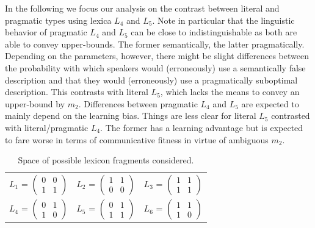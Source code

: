 \documentclass[10pt,a4paper]{article}
\begin{document}
In the following we focus our analysis on the contrast between literal and pragmatic types using lexica $L_4$ and $L_5$. Note in particular that the linguistic behavior of pragmatic $L_4$ and $L_5$ can be close to indistinguishable as both are able to convey upper-bounds. The former semantically, the latter pragmatically. Depending on the parameters, however, there might be slight differences between the probability with which speakers would (erroneously) use a semantically false description and that they would (erroneously) use a pragmatically suboptimal description. This contrasts with literal $L_5$, which lacks the means to convey an upper-bound by $m_2$. Differences between pragmatic $L_4$ and $L_5$ are expected to mainly depend on the learning bias. Things are less clear for literal $L_5$ contrasted with literal/pragmatic $L_4$. The former has a learning advantage but is expected to fare worse in terms of communicative fitness in virtue of ambiguous $m_2$.


\begin{table}
\centering 
\begin{tabular}{l c l}
$L_1$ = $\begin{pmatrix} 0 & 0 \\ 1 & 1 \end{pmatrix}$ & 
$L_2$ = $\begin{pmatrix} 1 & 1 \\ 0 & 0 \end{pmatrix}$ & 
$L_3$ = $\begin{pmatrix} 1 & 1 \\ 1 & 1 \end{pmatrix}$\\[0.5cm]

$L_4$ = $\begin{pmatrix} 0 & 1 \\ 1 & 0 \end{pmatrix}$ &
$L_5$ = $\begin{pmatrix} 0 & 1 \\ 1 & 1 \end{pmatrix}$ &
$L_6$ = $\begin{pmatrix} 1 & 1 \\ 1 & 0 \end{pmatrix}$

\end{tabular}


\caption{Space of possible lexicon fragments considered.}
\label{tab:lexica}
\end{table}
\end{document}
